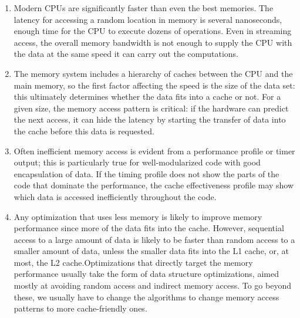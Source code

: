 \begin{enumerate}
\item 
Modern CPUs are significantly faster than even the best memories. The latency for accessing a random location in memory is several nanoseconds, enough time for the CPU to execute dozens of operations. Even in streaming access, the overall memory bandwidth is not enough to supply the CPU with the data at the same speed it can carry out the computations.

\item 
The memory system includes a hierarchy of caches between the CPU and the main memory, so the first factor affecting the speed is the size of the data set: this ultimately determines whether the data fits into a cache or not. For a given size, the memory access pattern is critical: if the hardware can predict the next access, it can hide the latency by starting the transfer of data into the cache before this data is requested.

\item 
Often inefficient memory access is evident from a performance profile or timer output; this is particularly true for well-modularized code with good encapsulation of data. If the timing profile does not show the parts of the code that dominate the performance, the cache effectiveness profile may show which data is accessed inefficiently throughout the code.

\item
Any optimization that uses less memory is likely to improve memory performance since more of the data fits into the cache. However, sequential access to a large amount of data is likely to be faster than random access to a smaller amount of data, unless the smaller data fits into the L1 cache, or, at most, the L2 cache.Optimizations that directly target the memory performance usually take the form of data structure optimizations, aimed mostly at avoiding random access and indirect memory access. To go beyond these, we usually have to change the algorithms to change memory access patterns to more cache-friendly ones.

\end{enumerate}